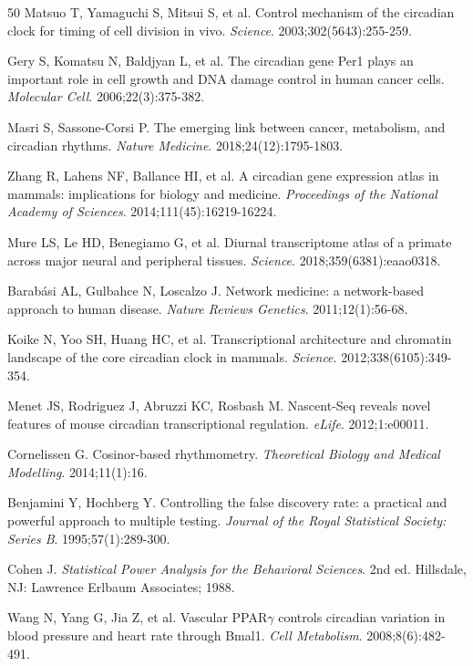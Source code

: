 \documentclass[11pt,a4paper]{article}
\begin{document}
\begin{thebibliography}{50}
Matsuo T, Yamaguchi S, Mitsui S, et al.
Control mechanism of the circadian clock for timing of cell division in vivo.
\textit{Science}. 2003;302(5643):255-259.

Gery S, Komatsu N, Baldjyan L, et al.
The circadian gene Per1 plays an important role in cell growth and DNA damage control in human cancer cells.
\textit{Molecular Cell}. 2006;22(3):375-382.

Masri S, Sassone-Corsi P.
The emerging link between cancer, metabolism, and circadian rhythms.
\textit{Nature Medicine}. 2018;24(12):1795-1803.

Zhang R, Lahens NF, Ballance HI, et al.
A circadian gene expression atlas in mammals: implications for biology and medicine.
\textit{Proceedings of the National Academy of Sciences}. 2014;111(45):16219-16224.

Mure LS, Le HD, Benegiamo G, et al.
Diurnal transcriptome atlas of a primate across major neural and peripheral tissues.
\textit{Science}. 2018;359(6381):eaao0318.

Barab\'asi AL, Gulbahce N, Loscalzo J.
Network medicine: a network-based approach to human disease.
\textit{Nature Reviews Genetics}. 2011;12(1):56-68.

Koike N, Yoo SH, Huang HC, et al.
Transcriptional architecture and chromatin landscape of the core circadian clock in mammals.
\textit{Science}. 2012;338(6105):349-354.

Menet JS, Rodriguez J, Abruzzi KC, Rosbash M.
Nascent-Seq reveals novel features of mouse circadian transcriptional regulation.
\textit{eLife}. 2012;1:e00011.

Cornelissen G.
Cosinor-based rhythmometry.
\textit{Theoretical Biology and Medical Modelling}. 2014;11(1):16.

Benjamini Y, Hochberg Y.
Controlling the false discovery rate: a practical and powerful approach to multiple testing.
\textit{Journal of the Royal Statistical Society: Series B}. 1995;57(1):289-300.

Cohen J.
\textit{Statistical Power Analysis for the Behavioral Sciences}. 2nd ed.
Hillsdale, NJ: Lawrence Erlbaum Associates; 1988.

Wang N, Yang G, Jia Z, et al.
Vascular PPAR$\gamma$ controls circadian variation in blood pressure and heart rate through Bmal1.
\textit{Cell Metabolism}. 2008;8(6):482-491.


\end{thebibliography}
\end{document}

